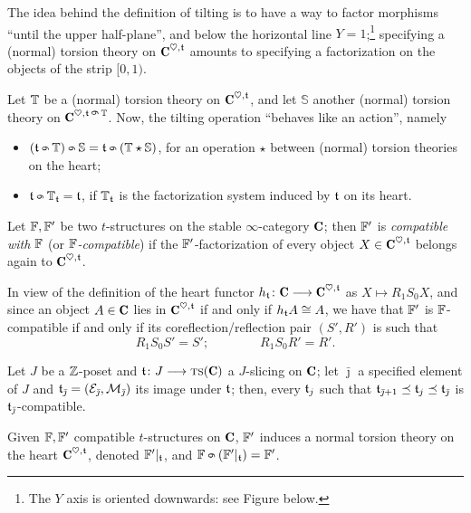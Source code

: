 \begin{remark}
The idea behind the definition of tilting is to have a way to factor morphisms ``until the upper half\hyp{}plane'', and below the horizontal line $Y=1$;\footnote{The $Y$ axis is oriented downwards: see Figure  below.} specifying a (normal) torsion theory on $\C^{\heart, \tee}$ amounts to specifying a factorization on the objects of the strip $[0,1)$.
\end{remark}
\begin{proposition}
Let $\mathbb{T}$ be a (normal) torsion theory on $\C^{\heart,\tee}$, and let $\mathbb{S}$ another (normal) torsion theory on $\C^{\heart, \tee\;\tilt\; \bT}$.  Now, the tilting operation ``behaves like an action'', namely
\begin{itemize}
\item $(\tee\tilt \bT)\tilt \mathbb{S} = \tee \tilt (\bT \star \mathbb{S})$, for an operation $\star$ between (normal) torsion theories on the heart; 
\item $\tee \tilt \bT_{\tee} = \tee$, if $\mathbb{T}_{\mathfrak{t}}$ is the factorization system induced by $\mathfrak{t}$ on its heart.
\end{itemize}
\end{proposition}
\begin{definition}
Let $\mathbb{F}, \mathbb{F}'$ be two $t$\hyp{}structures on the stable $\infty$\hyp{}category $\C$; then $\mathbb{F}'$ is \emph{compatible with $\mathbb{F}$} (or \emph{$\mathbb{F}$\hyp{}compatible}) if the $\mathbb{F}'$\hyp{}factorization of every object $X\in\C^{\heart,\tee}$ belongs again to $\C^{\heart,\tee}$.
\end{definition}
In view of the definition of the heart functor $h_\tee\colon \C \to \C^{\heart,\tee}$ as $X\mapsto R_1 S_0 X$, and since an object $A\in\C$ lies in $\C^{\heart,\tee}$ if and only if $h_{\mathfrak{t}} A \cong A$, we have that $\mathbb{F}'$ is $\mathbb{F}$\hyp{}compatible if and only if its coreflection\fshyp{}reflection pair $(S', R')$ is such that 
\[
R_1 S_0 S' = S'; \qquad\qquad R_1 S_0 R'  = R'.
\]
\begin{remark}
Let $J$ be a $\mathbb{Z}$\hyp{}poset and $\tee\colon J\to \ts(\C)$ a $J$\hyp{}slicing on $\C$; let $\bar \jmath$ a specified element of $J$ and $\mathfrak{t}_{\bar\jmath} = (\mathcal{E}_{\bar\jmath}, \mathcal{M}_{\bar\jmath})$ its image under $\mathfrak{t}$; then, every $\mathfrak{t}_j$ such that $\mathfrak{t}_{\bar\jmath+1}\preceq \mathfrak{t}_j \preceq \mathfrak{t}_{\bar\jmath}$ is $\mathfrak{t}_{\bar\jmath}$\hyp{}compatible.
\end{remark}
\begin{proposition}
Given $\mathbb{F}, \mathbb{F}'$ compatible $t$\hyp{}structures on $\C$, $\mathbb{F}'$ induces a normal torsion theory on the heart $\C^{\heart, \tee}$, denoted $\mathbb{F}'|_{\mathfrak{t}}$, and $\fF \tilt (\fF'|_\tee) = \fF'$.
\end{proposition}

